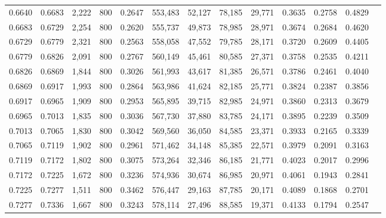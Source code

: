 \begin{tabular}{rrrrrrrrrrrrr}
0.6640 & 0.6683 &  2,222 & 800 &                                     0.2647 & 553,483 &  52,127 &  78,185 &  29,771 & 0.3635 & 0.2758 & 0.4829 \\
0.6683 & 0.6729 &  2,254 & 800 &                                     0.2620 & 555,737 &  49,873 &  78,985 &  28,971 & 0.3674 & 0.2684 & 0.4620 \\
0.6729 & 0.6779 &  2,321 & 800 &                                     0.2563 & 558,058 &  47,552 &  79,785 &  28,171 & 0.3720 & 0.2609 & 0.4405 \\
0.6779 & 0.6826 &  2,091 & 800 &                                     0.2767 & 560,149 &  45,461 &  80,585 &  27,371 & 0.3758 & 0.2535 & 0.4211 \\
0.6826 & 0.6869 &  1,844 & 800 &                                     0.3026 & 561,993 &  43,617 &  81,385 &  26,571 & 0.3786 & 0.2461 & 0.4040 \\
0.6869 & 0.6917 &  1,993 & 800 &                                     0.2864 & 563,986 &  41,624 &  82,185 &  25,771 & 0.3824 & 0.2387 & 0.3856 \\
0.6917 & 0.6965 &  1,909 & 800 &                                     0.2953 & 565,895 &  39,715 &  82,985 &  24,971 & 0.3860 & 0.2313 & 0.3679 \\
0.6965 & 0.7013 &  1,835 & 800 &                                     0.3036 & 567,730 &  37,880 &  83,785 &  24,171 & 0.3895 & 0.2239 & 0.3509 \\
0.7013 & 0.7065 &  1,830 & 800 &                                     0.3042 & 569,560 &  36,050 &  84,585 &  23,371 & 0.3933 & 0.2165 & 0.3339 \\
0.7065 & 0.7119 &  1,902 & 800 &                                     0.2961 & 571,462 &  34,148 &  85,385 &  22,571 & 0.3979 & 0.2091 & 0.3163 \\
0.7119 & 0.7172 &  1,802 & 800 &                                     0.3075 & 573,264 &  32,346 &  86,185 &  21,771 & 0.4023 & 0.2017 & 0.2996 \\
0.7172 & 0.7225 &  1,672 & 800 &                                     0.3236 & 574,936 &  30,674 &  86,985 &  20,971 & 0.4061 & 0.1943 & 0.2841 \\
0.7225 & 0.7277 &  1,511 & 800 &                                     0.3462 & 576,447 &  29,163 &  87,785 &  20,171 & 0.4089 & 0.1868 & 0.2701 \\
0.7277 & 0.7336 &  1,667 & 800 &                                     0.3243 & 578,114 &  27,496 &  88,585 &  19,371 & 0.4133 & 0.1794 & 0.2547 \\

\end{tabular}
